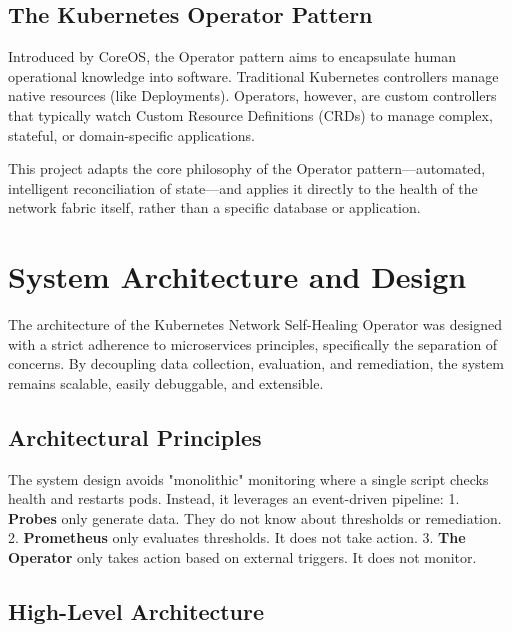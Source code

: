 \documentclass[12pt,a4paper]{article}
\begin{document}
\subsection{The Kubernetes Operator Pattern}
Introduced by CoreOS, the Operator pattern aims to encapsulate human operational knowledge into software. Traditional Kubernetes controllers manage native resources (like Deployments). Operators, however, are custom controllers that typically watch Custom Resource Definitions (CRDs) to manage complex, stateful, or domain-specific applications. 

This project adapts the core philosophy of the Operator pattern—automated, intelligent reconciliation of state—and applies it directly to the health of the network fabric itself, rather than a specific database or application.

\newpage

\section{System Architecture and Design}
\onehalfspacing
The architecture of the Kubernetes Network Self-Healing Operator was designed with a strict adherence to microservices principles, specifically the separation of concerns. By decoupling data collection, evaluation, and remediation, the system remains scalable, easily debuggable, and extensible.

\subsection{Architectural Principles}
The system design avoids "monolithic" monitoring where a single script checks health and restarts pods. Instead, it leverages an event-driven pipeline:
1. \textbf{Probes} only generate data. They do not know about thresholds or remediation.
2. \textbf{Prometheus} only evaluates thresholds. It does not take action.
3. \textbf{The Operator} only takes action based on external triggers. It does not monitor.

\subsection{High-Level Architecture}
\end{document}
